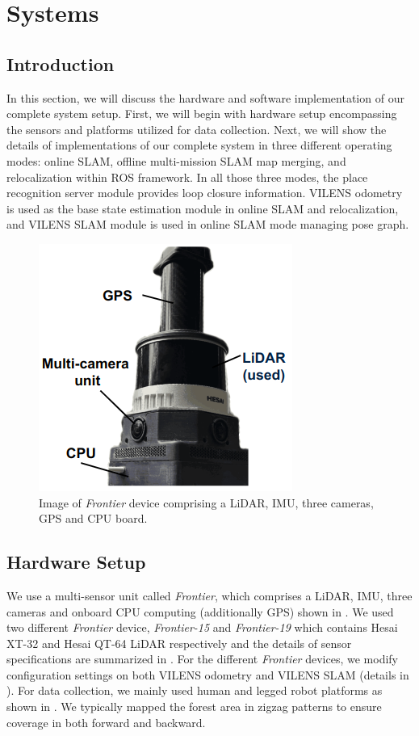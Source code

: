 \chapter{Systems}
\label{ch:system}
\section{Introduction}
In this section, we will discuss the hardware and software implementation of our complete system setup. First, we will begin with hardware setup encompassing the sensors and platforms utilized for data collection. Next, we will show the details of implementations of our complete system in three different operating modes: online SLAM, offline multi-mission SLAM map merging, and relocalization within ROS framework. In all those three modes, the place recognition server module provides loop closure information. VILENS odometry is used as the base state estimation module in online SLAM and relocalization, and VILENS SLAM module is used in online SLAM mode managing pose graph. 

\begin{figure}[htbp]
  \centering
  \includegraphics[width=0.4\columnwidth]{pics/setup_Frontier_pic2.png}
  \caption{Image of \emph{Frontier} device comprising a LiDAR, IMU, three cameras, GPS and CPU board. }
  \label{fig:frontier}
\end{figure}

\section{Hardware Setup}
\label{sec:system_setup}
We use a multi-sensor unit called \emph{Frontier}, which comprises a LiDAR, IMU, three cameras and onboard CPU computing (additionally GPS) shown in . We used two different \emph{Frontier} device, \emph{Frontier-15} and \emph{Frontier-19} which contains Hesai XT-32 and Hesai QT-64 LiDAR respectively and the details of sensor specifications are summarized in . For the different \emph{Frontier} devices, we modify configuration settings on both VILENS odometry and VILENS SLAM (details in \cite{wisth2023tro,proudman2022ras}). For data collection, we mainly used human and legged robot platforms as shown in . We typically mapped the forest area in zigzag patterns to ensure coverage in both forward and backward. 



